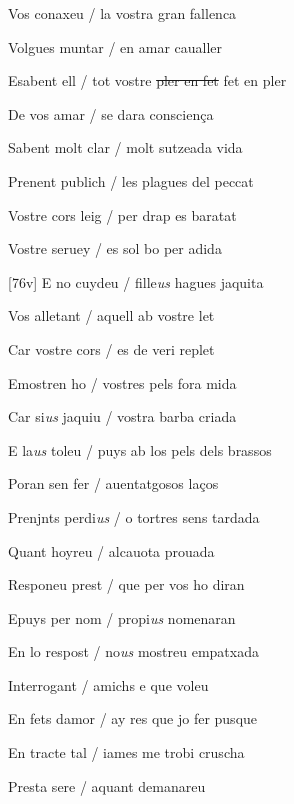\documentclass[12pt]{article}
\begin{document}
\begin{estrofa}

 Vos conaxeu / la vostra gran fallenca

 Volgues muntar / en amar caualler

 Esabent ell / tot vostre \sout{pler en fet} fet en pler

 De vos amar / se dara conscien\c{c}a

 Sabent molt clar / molt sutzeada vida

 Prenent publich / les plagues del peccat

 Vostre cors leig / per drap es baratat

 Vostre seruey / es sol bo per adida

\end{estrofa}



\begin{estrofa}

 [76v] E no cuydeu / fille\textit{us} hagues jaquita

 Vos alletant / aquell ab vostre let

 Car vostre cors / es de veri replet

 Emostren ho / vostres pels fora mida

 Car si\textit{us} jaquiu / vostra barba criada

 E la\textit{us} toleu / puys ab los pels dels brassos

 Poran sen fer / auentatgosos la\c{c}os

 Prenjnts perdi\textit{us} / o tortres sens tardada

\end{estrofa}



\begin{estrofa}

 Quant hoyreu / alcauota prouada

 Responeu prest / que per vos ho diran

 Epuys per nom / propi\textit{us} nomenaran

 En lo respost / no\textit{us} mostreu empatxada

 Interrogant / amichs e que voleu

 En fets damor / ay res que jo fer pusque

 En tracte tal / iames me trobi cruscha

 Presta sere / aquant demanareu

\end{estrofa}
\end{document}

